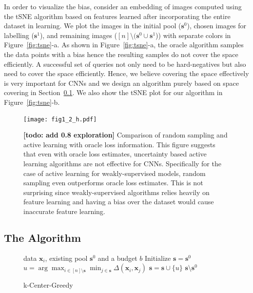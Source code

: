 \documentclass{article}
\newcommand{\todo}[1]{{\bf \color{red}[todo: #1]}}
\begin{document}
In order to visualize the bias, consider an embedding of images computed using the tSNE\cite{tsne} algorithm based on features learned after incorporating the entire dataset in learning. We plot the images in the initial pool ($\mathbf{s}^0$), chosen images for labelling ($\mathbf{s}^1$), and remaining images ($[n] \setminus (\mathbf{s}^0 \cup \mathbf{s}^1$)) with separate colors in Figure~\ref{fig:tsne}-a. As shown in Figure~\ref{fig:tsne}-a, the oracle algorithm samples the data points with a bias hence the resulting samples do not cover the space efficiently. A successful set of queries not only need to be hard-negatives but also need to cover the space efficiently. Hence, we believe covering the space effectively is very important for CNNs and we design an algorithm purely based on space covering in Section~\ref{sec:alg}. We also show the tSNE plot for our algorithm in Figure~\ref{fig:tsne}-b.

\begin{figure}[t]
\vspace{-3mm}
\texttt{[image: fig1\_2\_h.pdf]}
\vspace{-5mm}
\caption{\todo{add 0.8 exploration} Comparison of random sampling and active learning with oracle loss information. This figure suggests that even with oracle loss estimates, uncertainty based active learning algorithms are not effective for CNNs. Specifically for the case of active learning for weakly-supervised models, random sampling even outperforms oracle loss estimates. This is not surprising since weakly-supervised algorithms relies heavily on feature learning and having a bias over the dataset would cause inaccurate feature learning.}
\label{fig:neg}
\end{figure}

\subsection{The Algorithm}
\label{sec:alg}
  \begin{figure}
    \begin{minipage}{0.5\textwidth}
    \vspace{-8mm}
\begin{algorithm}[H]
   \caption{k-Center-Greedy}
      \label{alg:greedy}
\begin{algorithmic}
    data $\mathbf{x}_i$, existing pool $\mathbf{s}^0$ and a budget $b$
    \STATE Initialize $\mathbf{s}=\mathbf{s}^0$
   \REPEAT
   \STATE $u=\arg\max_{i \in [n] \setminus \mathbf{s}} \min_{j \in \mathbf{s}} \Delta(\mathbf{x}_i, \mathbf{x}_j)$
   \STATE $\mathbf{s} = \mathbf{s} \cup \{u\}$
    $\mathbf{s} \setminus \mathbf{s}^0$
\end{algorithmic}
\end{algorithm}
\vspace{-8mm}
    \end{minipage}
  \end{figure}
\end{document}
